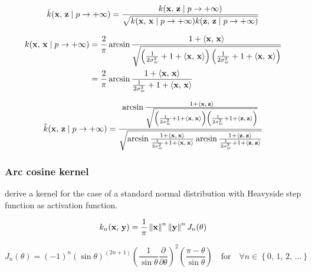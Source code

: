 \begin{equation}\label{eq:normalized}
	\tilde{k}(\mathbf{x},\,\mathbf{z} \mid p \to + \infty) = \frac{
		k(\mathbf{x},\,\mathbf{z} \mid p \to + \infty) }{
		\sqrt{
			k(\mathbf{x},\,\mathbf{x} \mid p \to + \infty)
			k(\mathbf{z},\,\mathbf{z} \mid p \to + \infty)
		}
	}
\end{equation}

\begin{align*}\label{eq:kernel_asin_xx}
	k(\mathbf{x},\,\mathbf{x} \mid p \to + \infty)
	 & = \frac{2}{\pi}
	\arcsin \frac{1 + \left\langle \mathbf{x},\,\mathbf{x} \right\rangle}{\sqrt{
			\left(
			\frac{1}{2\sigma_w^2} + 1 + \left\langle \mathbf{x},\,\mathbf{x} \right\rangle
			\right)
			\left(
			\frac{1}{2\sigma_w^2} + 1 + \left\langle \mathbf{x},\,\mathbf{x} \right\rangle
			\right)
	}}                 \\
	 & = \frac{2}{\pi}
	\arcsin \frac{1 + \left\langle \mathbf{x},\,\mathbf{x} \right\rangle}{
		\frac{1}{2\sigma_w^2} + 1 + \left\langle \mathbf{x},\,\mathbf{x} \right\rangle
	}                  \\
\end{align*}

\begin{equation}
	\tilde{k}(\mathbf{x},\,\mathbf{z} \mid p \to + \infty) =
	\frac{
		\arcsin \frac{1 + \left\langle \mathbf{x},\,\mathbf{z} \right\rangle}{\sqrt{
				\left(
				\frac{1}{2\sigma_w^2} + 1 + \left\langle \mathbf{x},\,\mathbf{x} \right\rangle
				\right)
				\left(
				\frac{1}{2\sigma_w^2} + 1 + \left\langle \mathbf{z},\,\mathbf{z} \right\rangle
				\right)
			}}
	}{
		\sqrt{
			\arcsin \frac{1 + \left\langle \mathbf{x},\,\mathbf{x} \right\rangle}{
				\frac{1}{2\sigma_w^2} + 1 + \left\langle \mathbf{x},\,\mathbf{x} \right\rangle
			}
			\arcsin \frac{1 + \left\langle \mathbf{z},\,\mathbf{z} \right\rangle}{
				\frac{1}{2\sigma_w^2} + 1 + \left\langle \mathbf{z},\,\mathbf{z} \right\rangle
			}
		}
	}
\end{equation}

\subsubsection{Arc cosine kernel}

\Textcite{choLargemarginClassificationInfinite2010} derive a kernel for the case of a standard normal
distribution with Heavyside step function as activation function.

\begin{equation}\label{eq:kernel_cho}
	k_n(\mathbf{x},\,\mathbf{y}) = \frac{1}{\pi} \left\lVert \mathbf{x} \right\rVert^n \left\lVert \mathbf{y} \right\rVert^n J_n(\theta)
\end{equation}

\begin{equation}
	J_n(\theta) = (-1)^n \left( \sin \theta \right)^{(2n+1)}
	\left( \frac{1}{\sin \theta} \frac{\partial}{\partial \theta} \right)^2
	\left( \frac{\pi - \theta}{\sin \theta} \right)
	\quad \text{for} \quad \forall n \in \left\{ 0,\,1,\,2,\,\dots \right\}
\end{equation}


